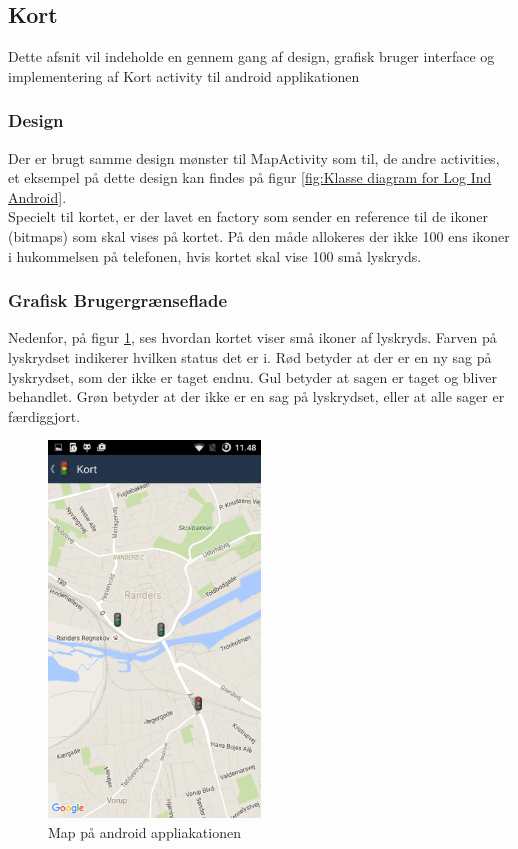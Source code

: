	\clearpage		
	
	\subsection{Kort}
		Dette afsnit vil indeholde en gennem gang af design, grafisk bruger interface og implementering af Kort activity til android applikationen
	\subsubsection{Design}
	Der er brugt samme design mønster til MapActivity som til, de andre activities, et eksempel på dette design kan findes på figur \ref{fig:Klasse diagram for Log Ind Android}.
	\\Specielt til kortet, er der lavet en factory som sender en reference til de ikoner (bitmaps) som skal vises på kortet. På den måde allokeres der ikke 100 ens ikoner i hukommelsen på telefonen, hvis kortet skal vise 100 små lyskryds.

	\subsubsection{Grafisk Brugergrænseflade}
	Nedenfor, på figur \ref{fig:Map på android appliakationen}, ses hvordan kortet viser små ikoner af lyskryds. Farven på lyskrydset indikerer hvilken status det er i. Rød betyder at der er en ny sag på lyskrydset, som der ikke er taget endnu. Gul betyder at sagen er taget og bliver behandlet. Grøn betyder at der ikke er en sag på lyskrydset, eller at alle sager er færdiggjort.
	\begin{figure} [!ht]
		\begin{center}
			\includegraphics[height=10cm]{Android/Billeder/AndroidMap}
		\end{center}
		\caption{Map på android appliakationen}
		\label{fig:Map på android appliakationen}
	\end{figure}
	

